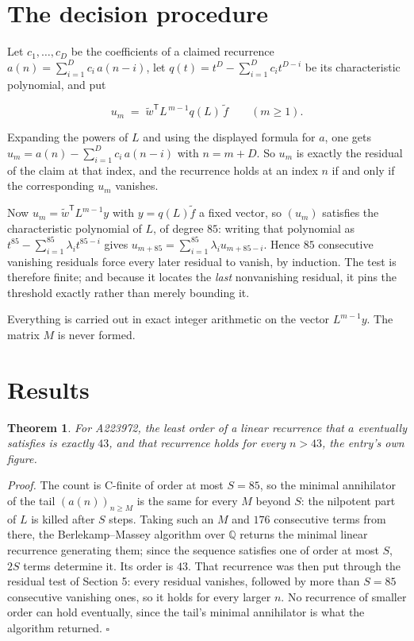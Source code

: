 \documentclass[11pt]{article}
\newtheorem{theorem}{Theorem}
\theoremstyle{definition}
\begin{document}
\section{The decision procedure}

Let $c_1,\dots,c_D$ be the coefficients of a claimed recurrence $a(n) = \sum_{i=1}^{D} c_i\,a(n-i)$, let $q(t) = t^{D} - \sum_{i=1}^{D} c_i t^{D-i}$ be its characteristic polynomial, and put

\[u_m \;=\; \tilde w^{\mathsf T} L^{\,m-1} q(L)\,\tilde f \qquad (m \ge 1).\]

Expanding the powers of $L$ and using the displayed formula for $a$, one gets $u_m = a(n) - \sum_{i=1}^{D} c_i\,a(n-i)$ with $n = m + D$. So $u_m$ is exactly the residual of the claim at that index, and the recurrence holds at an index $n$ if and only if the corresponding $u_m$ vanishes.

Now $u_m = \tilde w^{\mathsf T} L^{m-1} y$ with $y = q(L)\tilde f$ a fixed vector, so $(u_m)$ satisfies the characteristic polynomial of $L$, of degree $85$: writing that polynomial as $t^{85} - \sum_{i=1}^{85} \lambda_i t^{85-i}$ gives $u_{m+85} = \sum_{i=1}^{85} \lambda_i u_{m+85-i}$. Hence $85$ consecutive vanishing residuals force every later residual to vanish, by induction. The test is therefore finite; and because it locates the {\itshape last} nonvanishing residual, it pins the threshold exactly rather than merely bounding it.

Everything is carried out in exact integer arithmetic on the vector $L^{m-1}y$. The matrix $M$ is never formed.

\section{Results}

\begin{theorem} For A223972, the least order of a linear recurrence that $a$ eventually satisfies is exactly $43$, and that recurrence holds for every $n > 43$, the entry's own figure.\end{theorem}

{\itshape Proof.} The count is C-finite of order at most $S = 85$, so the minimal annihilator of the tail $(a(n))_{n \ge M}$ is the same for every $M$ beyond $S$: the nilpotent part of $L$ is killed after $S$ steps. Taking such an $M$ and $176$ consecutive terms from there, the Berlekamp--Massey algorithm over $\mathbb{Q}$ returns the minimal linear recurrence generating them; since the sequence satisfies one of order at most $S$, $2S$ terms determine it. Its order is $43$. That recurrence was then put through the residual test of Section 5: every residual vanishes, followed by more than $S = 85$ consecutive vanishing ones, so it holds for every larger $n$. No recurrence of smaller order can hold eventually, since the tail's minimal annihilator is what the algorithm returned. $\square$
\end{document}
